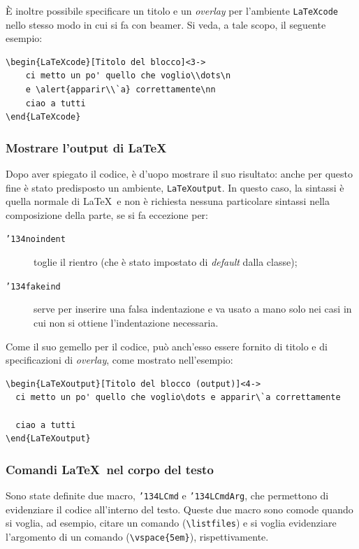 \documentclass[a4paper,10pt]{article}
\newcommand{\bs}{{\char'134}}%
\newcommand{\pkg}[1]{\textsf{#1}}
\let\cls\pkg
\newcommand{\env}[1]{\texttt{#1}}
\newcommand{\cmd}[1]{\texttt{\bs #1}}
\begin{document}
\`E inoltre possibile specificare un titolo e un \textit{overlay} per
l'ambiente \env{LaTeXcode} nello stesso modo in cui si fa con
\cls{beamer}. Si veda, a tale scopo, il seguente esempio:
\begin{Verbatim}[gobble=0]
\begin{LaTeXcode}[Titolo del blocco]<3->
	ci metto un po' quello che voglio\\dots\n
	e \alert{apparir\\`a} correttamente\nn
	ciao a tutti
\end{LaTeXcode}
\end{Verbatim}
 
\subsubsection{Mostrare l'output di \LaTeX}
Dopo aver spiegato il codice, è d'uopo mostrare il suo risultato:
 anche per questo fine è stato predisposto un ambiente,
\env{LaTeXoutput}. In questo caso, la sintassi è quella normale di
\LaTeX\ e non è richiesta nessuna particolare sintassi nella
composizione della parte, se si fa eccezione per:
\begin{description}
  \item[\cmd{noindent}]toglie il rientro (che è stato impostato di
    \textit{default} dalla classe);
  \item[\cmd{fakeind}]serve per inserire una falsa indentazione e va
    usato a mano solo nei casi in cui non si ottiene l'indentazione
    necessaria.
\end{description}

Come il suo gemello per il codice, può anch'esso essere fornito di
titolo e di specificazioni di \emph{overlay}, come mostrato
nell'esempio:
\begin{Verbatim}
\begin{LaTeXoutput}[Titolo del blocco (output)]<4->
  ci metto un po' quello che voglio\dots e apparir\`a correttamente
  
  ciao a tutti
\end{LaTeXoutput}
\end{Verbatim}

\subsubsection{Comandi \LaTeX\ nel corpo del testo}
Sono state definite due macro, \cmd{LCmd} e \cmd{LCmdArg}, che
permettono di evidenziare il codice all'interno del testo. Queste due
macro sono comode quando si voglia, ad esempio, citare un comando
(\verb+\listfiles+) e si voglia evidenziare l'argomento di un comando
(\verb+\vspace{5em}+), rispettivamente.
\end{document}
